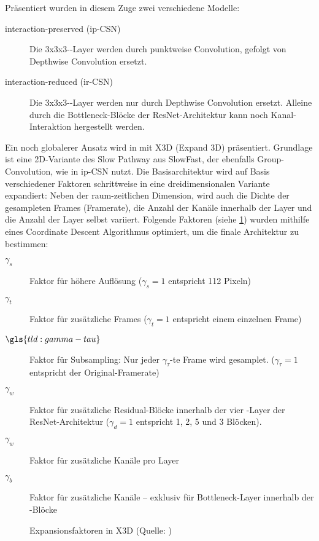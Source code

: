 Präsentiert wurden in diesem Zuge zwei verschiedene Modelle:
\begin{description}
    \item[interaction-preserved (ip-CSN)] Die 3x3x3-\conv-Layer werden durch punktweise Convolution, gefolgt von Depthwise Convolution ersetzt.
    \item[interaction-reduced (ir-CSN)]  Die 3x3x3-\conv-Layer werden nur durch Depthwise Convolution ersetzt.
    Alleine durch die Bottleneck-Blöcke der ResNet-Architektur kann noch Kanal-Interaktion hergestellt werden.
\end{description}

Ein noch globalerer Ansatz wird in \cite{Feichtenhofer20} mit X3D (Expand 3D) präsentiert.
Grundlage ist eine 2D-Variante des Slow Pathway aus SlowFast, der ebenfalls Group-Convolution, wie in ip-CSN nutzt.
Die Basisarchitektur wird auf Basis verschiedener Faktoren schrittweise in eine dreidimensionalen Variante expandiert:
Neben der raum-zeitlichen Dimension, wird auch die Dichte der gesampleten Frames (Framerate), die Anzahl der Kanäle innerhalb der Layer und die Anzahl der Layer selbst variiert.
Folgende Faktoren (siehe \ref{fig:x3d}) wurden mithilfe eines Coordinate Descent Algorithmus \cite{Wright15} optimiert, um die finale Architektur zu bestimmen:

\begin{description}
    \item[$\gamma_s$] Faktor für höhere Auflösung ($\gamma_s = 1$ entspricht 112 Pixeln)
    \item[$\gamma_t$] Faktor für zusätzliche Frames ($\gamma_t = 1$ entspricht einem einzelnen Frame)
    \item[$\gls{tld:gamma-tau}$] Faktor für Subsampling: Nur jeder $\gamma_\tau$-te Frame wird gesamplet. ($\gamma_\tau = 1$ entspricht der Original-Framerate)
    \item[$\gamma_w$] Faktor für zusätzliche Residual-Blöcke innerhalb der vier \res-Layer der ResNet-Architektur ($\gamma_d = 1$ entspricht 1, 2, 5 und 3 Blöcken).
    \item[$\gamma_w$] Faktor für zusätzliche Kanäle pro Layer
    \item[$\gamma_b$] Faktor für zusätzliche Kanäle -- exklusiv für Bottleneck-Layer innerhalb der \res-Blöcke
\end{description}

\begin{figure}[h!]
    \centering
    \caption{Expansionsfaktoren in X3D (Quelle: \cite{Feichtenhofer20})}
    \label{fig:x3d}
\end{figure}

